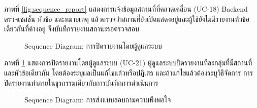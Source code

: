 ภาพที่ \ref{fig:sequence_report} แสดงการแจ้งข้อมูลสถานที่ที่คลาดเคลื่อน (UC-18) Backend ตรวจเซสชัน หัวข้อ และหมายเหตุ แล้วตรวจว่าสถานที่ยังเปิดแสดงอยู่และผู้ใช้ยังไม่มีรายงานหัวข้อเดียวกันที่ค้างอยู่ จึงบันทึกรายงานสถานะรอตรวจสอบ

\begin{figure}[H]
\centering
{}
\caption{Sequence Diagram: การปิดรายงานโดยผู้ดูแลระบบ}
\label{fig:sequence_resolve}
\end{figure}

ภาพที่ \ref{fig:sequence_resolve} แสดงการปิดรายงานโดยผู้ดูแลระบบ (UC-21) ผู้ดูแลระบบปิดรายงานทีละกลุ่มที่มีสถานที่และหัวข้อเดียวกัน โดยต้องระบุผลเป็นแก้ไขแล้วหรือปฏิเสธ และถ้าแก้ไขแล้วต้องระบุวิธีจัดการ การปิดรายงานทำภายในธุรกรรมเดียวกับการบันทึกการดำเนินการ

\begin{figure}[H]
\centering
{}
\caption{Sequence Diagram: การส่งแบบสอบถามความพึงพอใจ}
\label{fig:sequence_survey}
\end{figure}

